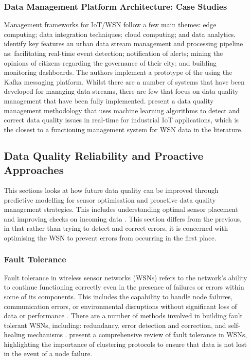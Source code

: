 \subsubsection{Data Management Platform Architecture: Case Studies}

Management frameworks for IoT/WSN follow a few main themes: edge computing; data integration techniques; cloud computing; and data analytics. \cite{badidiBuildingDataPipeline2018} identify key features an urban data stream management and processing pipeline as: facilitating real-time event detection; notification of alerts; mining the opinions of citizens regarding the governance of their city; and building monitoring dashboards. The authors implement a prototype of the using the Kafka messaging platform. Whilst there are a number of systems that have been developed for managing data streams, there are few that focus on data quality management that have been fully implemented. \cite{ehrlingerDaQLMonitorData2019} present a data quality management methodology that uses machine learning algorithms to detect and correct data quality issues in real-time for industrial IoT applications, which is the closest to a functioning management system for WSN data in the literature.

\subsection{Data Quality Reliability and Proactive Approaches} \label{ssec:data_quality_prediction}

This sections looks at how future data quality can be improved through predictive modelling for sensor optimisation and proactive data quality management strategies. This includes understanding optimal sensor placement \citep{kimOptimizationNumberWireless2024} and improving checks on incoming data \citep{mohammadiSmartCityDigital2017}. This section differs from the previous, in that rather than trying to detect and correct errors, it is concerned with optimising the WSN to prevent errors from occurring in the first place.

\subsubsection{Fault Tolerance}

Fault tolerance in wireless sensor networks (WSNs) refers to the network’s ability to continue functioning correctly even in the presence of failures or errors within some of its components. This includes the capability to handle node failures, communication errors, or environmental disruptions without significant loss of data or performance \citep{guravaiahDataCollectionProtocols2020}. There are a number of methods involved in building fault tolerant WSNs, including: redundancy, error detection and correction, and self-healing mechanisms \citep{guravaiahDataCollectionProtocols2020}. \cite{elkhediriWirelessSensorNetworks2022} present a comprehensive review of fault tolerance in WSNs, highlighting the importance of clustering protocols to ensure that data is not lost in the event of a node failure.

